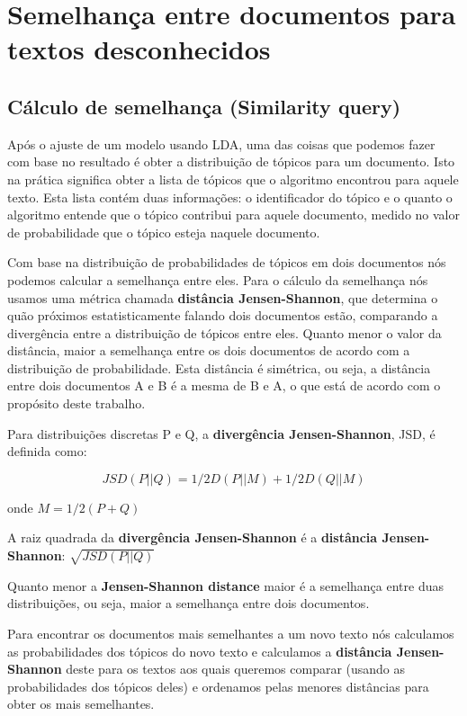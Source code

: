 \section{Semelhança entre documentos para textos desconhecidos}

\subsection{Cálculo de semelhança (Similarity query)}

Após o ajuste de um modelo usando LDA, uma das coisas que podemos fazer com base no resultado é obter a distribuição de tópicos para um documento.
Isto na prática significa obter a lista de tópicos que o algoritmo encontrou para aquele texto. Esta lista contém duas informações: o identificador
do tópico e o quanto o algoritmo entende que o tópico contribui para aquele documento, medido no valor de probabilidade que o tópico esteja 
naquele documento.

Com base na distribuição de probabilidades de tópicos em dois documentos nós podemos calcular a semelhança entre eles. Para o cálculo da semelhança 
nós usamos uma métrica chamada \textbf{distância Jensen-Shannon}, que determina o quão próximos estatisticamente falando dois documentos estão, 
comparando a divergência entre a distribuição de tópicos entre eles. Quanto menor o valor da distância, maior a semelhança entre os dois documentos 
de acordo com a distribuição de probabilidade. Esta distância é simétrica, ou seja, a distância entre dois documentos A e B é a mesma de B e A, o que está de acordo com o 
propósito deste trabalho.

Para distribuições discretas P e Q, a \textbf{divergência Jensen-Shannon}, JSD, é definida como:

\[JSD(P||Q) = 1/2D(P||M) + 1/2D(Q||M)\]

onde \(M = 1/2(P + Q)\)

A raiz quadrada da \textbf{divergência Jensen-Shannon} é a \textbf{distância Jensen-Shannon}: \(\sqrt{JSD(P||Q)}\)

Quanto menor a \textbf{Jensen-Shannon distance} maior é a semelhança entre duas distribuições, ou seja, maior a semelhança entre dois documentos.

Para encontrar os documentos mais semelhantes a um novo texto nós calculamos as probabilidades dos tópicos do novo texto e calculamos a 
\textbf{distância Jensen-Shannon} deste para os textos aos quais queremos comparar (usando as probabilidades dos tópicos deles) e ordenamos pelas 
menores distâncias para obter os mais semelhantes.

